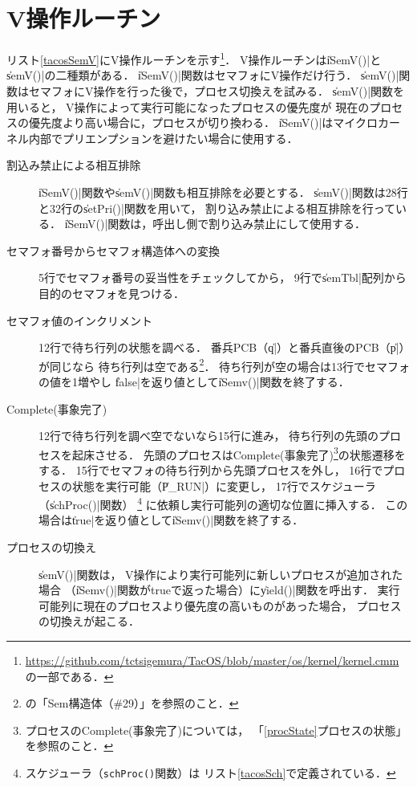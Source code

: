 \section{V操作ルーチン}
\label{tacosVOP}
リスト\ref{tacosSemV}にV操作ルーチンを示す\footnote{
  \url{https://github.com/tctsigemura/TacOS/blob/master/os/kernel/kernel.cmm}
  の一部である．}．
V操作ルーチンは\|iSemV()|と\|semV()|の二種類がある．
\|iSemV()|関数はセマフォにV操作だけ行う．
\|semV()|関数はセマフォにV操作を行った後で，プロセス切換えを試みる．
\|semV()|関数を用いると，
V操作によって実行可能になったプロセスの優先度が
現在のプロセスの優先度より高い場合に，プロセスが切り換わる．
\|iSemV()|はマイクロカーネル内部でプリエンプションを避けたい場合に使用する．



\begin{description}
\item [割込み禁止による相互排除]
  \|iSemV()|関数や\|semV()|関数も相互排除を必要とする．
  \|semV()|関数は28行と32行の\|setPri()|関数を用いて，
  割り込み禁止による相互排除を行っている．
  \|iSemV()|関数は，呼出し側で割り込み禁止にして使用する．
\item [セマフォ番号からセマフォ構造体への変換]
  5行でセマフォ番号の妥当性をチェックしてから，
  9行で\|semTbl|配列から目的のセマフォを見つける．
\item [セマフォ値のインクリメント]
  12行で待ち行列の状態を調べる．
  番兵PCB（\|q|）と番兵直後のPCB（\|p|）が同じなら
  待ち行列は空である\footnote{
    の「Sem構造体（\#29）」を参照のこと．}．
  待ち行列が空の場合は13行でセマフォの値を1増やし
  \|false|を返り値として\|iSemv()|関数を終了する．
\item [Complete(事象完了)]
  12行で待ち行列を調べ空でないなら15行に進み，
  待ち行列の先頭のプロセスを起床させる．
  先頭のプロセスはComplete(事象完了)\footnote{
    プロセスのComplete(事象完了)については，
    「\ref{procState}プロセスの状態」を参照のこと．}の状態遷移をする．
  15行でセマフォの待ち行列から先頭プロセスを外し，
  16行でプロセスの状態を実行可能（\|P_RUN|）に変更し，
  17行でスケジューラ（\|schProc()|関数）
  \footnote{
    スケジューラ（\texttt{schProc()}関数）は
    リスト\ref{tacosSch}で定義されている．}
  に依頼し実行可能列の適切な位置に挿入する．
  この場合は\|true|を返り値として\|iSemv()|関数を終了する．
\item [プロセスの切換え]
  \|semV()|関数は，
  V操作により実行可能列に新しいプロセスが追加された場合
  （\|iSemv()|関数がtrueで返った場合）に\|yield()|関数を呼出す．
  実行可能列に現在のプロセスより優先度の高いものがあった場合，
  プロセスの切換えが起こる．
\end{description}


